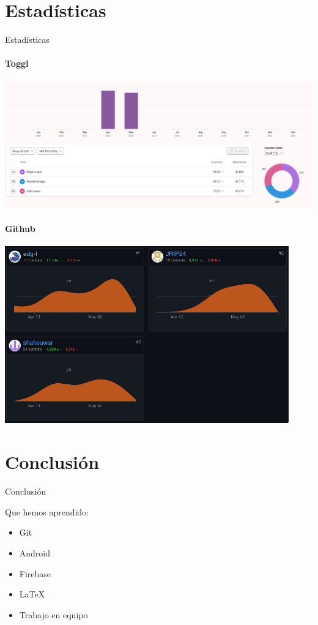 \documentclass[12pt]{beamer}
\begin{document}
\section{Estadísticas}
\begin{frame}{Estadísticas}

 {
\framesubtitle{Toggl}
\includegraphics[width=\textwidth]{toggl-stats}
}

 {
\framesubtitle{Github}

\includegraphics[width=0.92\textwidth]{git-contributors}
}

\end{frame}


\section{Conclusión}
\begin{frame}{Conclusión}

Que hemos aprendido:

\begin{itemize}
\item Git
\item Android
\item Firebase
\item \LaTeX
\item Trabajo en equipo
\end{itemize}


\end{frame}
\end{document}
